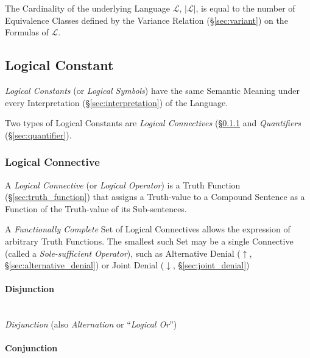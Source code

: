 The Cardinality of the underlying Language $\mathcal{L}$,
$|\mathcal{L}|$, is equal to the number of Equivalence Classes defined
by the Variance Relation (\S\ref{sec:variant}) on the Formulas of
$\mathcal{L}$.



\subsection{Logical Constant}\label{sec:logical_constant}

\emph{Logical Constants} (or \emph{Logical Symbols}) have the same
Semantic Meaning under every Interpretation
(\S\ref{sec:interpretation}) of the Language.

Two types of Logical Constants are \emph{Logical Connectives}
(\S\ref{sec:logical_connective} and \emph{Quantifiers}
(\S\ref{sec:quantifier}).



\subsubsection{Logical Connective}\label{sec:logical_connective}

A \emph{Logical Connective} (or \emph{Logical Operator}) is a Truth
Function (\S\ref{sec:truth_function}) that assigns a Truth-value to a
Compound Sentence as a Function of the Truth-value of its
Sub-sentences.

A \emph{Functionally Complete} Set of Logical Connectives allows the
expression of arbitrary Truth Functions. The smallest such Set may be
a single Connective (called a \emph{Sole-sufficient Operator}), such
as Alternative Denial ($\uparrow$, \S\ref{sec:alternative_denial}) or
Joint Denial ($\downarrow$, \S\ref{sec:joint_denial})



\paragraph{Disjunction}\label{sec:disjunction}\hfill \\

\emph{Disjunction} (also \emph{Alternation} or ``\emph{Logical Or}'')



\paragraph{Conjunction}\label{sec:conjunction}\hfill \\

